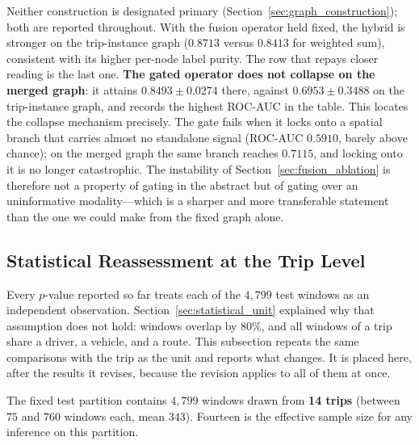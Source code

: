 \documentclass[journal]{IEEEtran}
\begin{document}
Neither construction is designated primary (Section~\ref{sec:graph_construction}); both are reported throughout. With the fusion operator held fixed, the hybrid is stronger on the trip-instance graph ($0.8713$ versus $0.8413$ for weighted sum), consistent with its higher per-node label purity. The row that repays closer reading is the last one. \textbf{The gated operator does not collapse on the merged graph}: it attains $0.8493 \pm 0.0274$ there, against $0.6953 \pm 0.3488$ on the trip-instance graph, and records the highest ROC-AUC in the table. This locates the collapse mechanism precisely. The gate fails when it locks onto a spatial branch that carries almost no standalone signal (ROC-AUC $0.5910$, barely above chance); on the merged graph the same branch reaches $0.7115$, and locking onto it is no longer catastrophic. The instability of Section~\ref{sec:fusion_ablation} is therefore not a property of gating in the abstract but of gating over an uninformative modality---which is a sharper and more transferable statement than the one we could make from the fixed graph alone.

\subsection{Statistical Reassessment at the Trip Level}
\label{sec:trip_level}

Every $p$-value reported so far treats each of the $4{,}799$ test windows as an independent observation. Section~\ref{sec:statistical_unit} explained why that assumption does not hold: windows overlap by $80\%$, and all windows of a trip share a driver, a vehicle, and a route. This subsection repeats the same comparisons with the trip as the unit and reports what changes. It is placed here, after the results it revises, because the revision applies to all of them at once.

The fixed test partition contains $4{,}799$ windows drawn from \textbf{14 trips} (between $75$ and $760$ windows each, mean $343$). Fourteen is the effective sample size for any inference on this partition.
\end{document}
